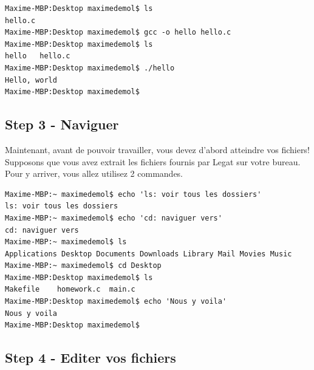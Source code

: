 \documentclass[11pt,a4paper]{article}
\begin{document}
\begin{lstlisting}[style=Bash]
Maxime-MBP:Desktop maximedemol$ ls
hello.c
Maxime-MBP:Desktop maximedemol$ gcc -o hello hello.c
Maxime-MBP:Desktop maximedemol$ ls
hello	hello.c
Maxime-MBP:Desktop maximedemol$ ./hello
Hello, world
Maxime-MBP:Desktop maximedemol$ 
\end{lstlisting}
\vspace{12pt}


\subsection{Step 3 - Naviguer}

Maintenant, avant de pouvoir travailler, vous devez d'abord atteindre vos fichiers! Supposons que vous avez extrait les fichiers fournis par Legat sur votre bureau. Pour y arriver, vous allez utilisez 2 commandes.

\begin{lstlisting}[style=Bash]
Maxime-MBP:~ maximedemol$ echo 'ls: voir tous les dossiers'
ls: voir tous les dossiers
Maxime-MBP:~ maximedemol$ echo 'cd: naviguer vers'
cd: naviguer vers
Maxime-MBP:~ maximedemol$ ls
Applications Desktop Documents Downloads Library Mail Movies Music
Maxime-MBP:~ maximedemol$ cd Desktop
Maxime-MBP:Desktop maximedemol$ ls
Makefile	homework.c	main.c
Maxime-MBP:Desktop maximedemol$ echo 'Nous y voila'
Nous y voila
Maxime-MBP:Desktop maximedemol$ 
\end{lstlisting}
\vspace{12pt}

\subsection{Step 4 - Editer vos fichiers}
\end{document}
